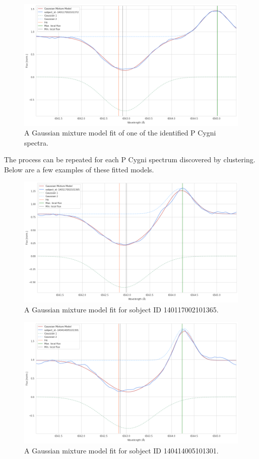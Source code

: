 \begin{figure}[h]
\centering
\includegraphics[scale=0.45]{figures/p cugni fitted.png}
\caption{A Gaussian mixture model fit of one of the identified P Cygni spectra.}
\end{figure}

The process can be repeated for each P Cygni spectrum discovered by clustering. Below are a few examples of these fitted models. 

\begin{figure}[h]
\centering
\includegraphics[scale=0.45]{figures/p cygni fitted 2.png}
\caption{A Gaussian mixture model fit for sobject ID 140117002101365. }
\end{figure}

\begin{figure}[h]
\centering
\includegraphics[scale=0.45]{figures/p cygni fitted 3.png}
\caption{A Gaussian mixture model fit for sobject ID 140414005101301. }
\end{figure}

